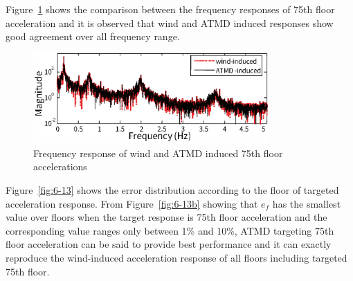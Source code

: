 Figure~\ref{fig:6-12} shows the comparison between the frequency responses of 75th floor acceleration and it is observed that wind and ATMD induced responses show good agreement over all frequency range. 

\begin{figure}[ht]
\centering
\includegraphics[width=0.8\textwidth] {figure/6-12.eps}
\caption{Frequency response of wind and ATMD induced 75th floor accelerations}
\label{fig:6-12}
\end{figure}

Figure~\ref{fig:6-13} shows the error distribution according to the floor of targeted acceleration response. From Figure~\ref{fig:6-13b} showing that $e_{f}$ has the smallest value over floors when the target response is 75th floor acceleration and the corresponding value ranges only between 1\% and 10\%, ATMD targeting 75th floor acceleration can be said to provide best performance and it can exactly reproduce the wind-induced acceleration response of all floors including targeted 75th floor.

